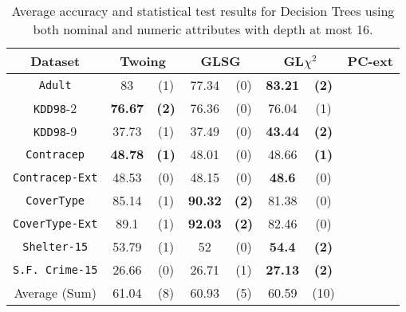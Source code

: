 \begin{table}
\small
\caption{Average accuracy and statistical test results for  Decision Trees using both nominal and numeric attributes with depth at most 16.}
\centering
\begin{tabular}{c|cc|cc|cc|cc} 
Dataset              &        \multicolumn{2}{c|}{Twoing} &   \multicolumn{2}{c|}{GLSG} &   \multicolumn{2}{c|}{GL$\chi^2$} & \multicolumn{2}{c}{PC-ext} \\  \hline   
{\tt Adult}          &  83            &  (1)              &  77.34      &  (0)          &  {\bf 83.21} &  {\bf (2)}  & &       \\
{\tt KDD98}-2        &  {\bf 76.67}   &  {\bf (2)}        &  76.36      &  (0)          &  76.04       &  (1)        & &       \\
{\tt KDD98}-9        &  37.73         &  (1)              &  37.49      &  (0)          &  {\bf 43.44} &  {\bf (2)}  & &       \\
{\tt Contracep}      &  {\bf 48.78}   &  {\bf (1)}        &  48.01      &  (0)          &  48.66       &  {\bf (1)}  & &       \\
{\tt Contracep-Ext}  &  48.53         &  (0)              &  48.15      &  (0)          &  {\bf 48.6}  &  (0)        & &       \\
{\tt CoverType}      &  85.14         &  (1)              &  {\bf 90.32}&  {\bf (2)}    &  81.38       &  (0)        & &       \\
{\tt CoverType-Ext}  &  89.1          &  (1)              &  {\bf 92.03}&  {\bf (2)}    &  82.46       &  (0)        & &       \\
{\tt Shelter-15}     &  53.79         &  (1)              &  52         &  (0)          &  {\bf 54.4}  &  {\bf (2)}  & &       \\   
{\tt S.F. Crime-15}  &  26.66         &  (0)              &  26.71      &  (1)          &  {\bf 27.13} &  {\bf (2)}  & &       \\
\hline
Average (Sum)        &   61.04        &  (8)              & 60.93       & (5)           &   60.59     & (10)

\end{tabular}
\label{exp:secondsetnumeric}
\normalsize
\end{table}

